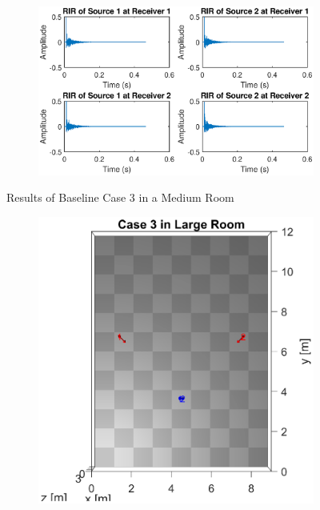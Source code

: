 \documentclass[a4paper,twoside,12pt,hidelinks]{article}
\begin{document}
\begin{appendices}
\begin{figure}[H]
\begin{subfigure}[H]{0.6\textwidth}
\includegraphics[width=\textwidth]{3m_ir}
\end{subfigure}
\caption{Results of Baseline Case 3 in a Medium Room}
\end{figure}
\begin{figure}[H]
\centering
\begin{subfigure}[H]{0.35\textwidth}
\includegraphics[width=\textwidth]{3l_lo}
\end{subfigure}
\begin{subfigure}[H]{0.6\textwidth}

\end{subfigure}
\end{figure}
\end{appendices}
\end{document}

